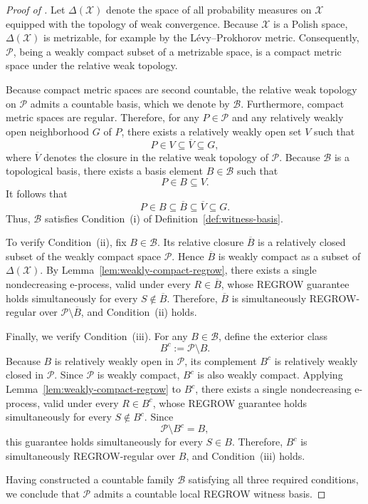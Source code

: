 \documentclass[12pt]{article}
\theoremstyle{spaced}
\theoremstyle{remark}
\begin{document}
\begin{proof}[Proof of ]
Let $\Delta(\mathcal{X})$ denote the space of all probability
measures on $\mathcal{X}$ equipped with the topology of weak
convergence. Because $\mathcal{X}$ is a Polish space,
$\Delta(\mathcal{X})$ is metrizable, for example by the
L\'evy--Prokhorov metric. Consequently, $\mathcal{P}$, being a
weakly compact subset of a metrizable space, is a compact metric
space under the relative weak topology.

Because compact metric spaces are second countable, the relative
weak topology on $\mathcal{P}$ admits a countable basis, which we
denote by $\mathcal{B}$. Furthermore, compact metric spaces are
regular. Therefore, for any $P\in\mathcal{P}$ and any relatively
weakly open neighborhood $G$ of $P$, there exists a relatively
weakly open set $V$ such that
\[
    P\in V\subseteq\overline V\subseteq G,
\]
where $\overline V$ denotes the closure in the relative weak
topology of $\mathcal{P}$. Because $\mathcal{B}$ is a
topological basis, there exists a basis element
$B\in\mathcal{B}$ such that
\[
    P\in B\subseteq V.
\]
It follows that
\[
    P\in B\subseteq\overline B
    \subseteq\overline V\subseteq G.
\]
Thus, $\mathcal{B}$ satisfies Condition~\textup{(i)} of
Definition~\ref{def:witness-basis}.

To verify Condition~\textup{(ii)}, fix $B\in\mathcal{B}$. Its
relative closure $\overline B$ is a relatively closed subset of
the weakly compact space $\mathcal{P}$. Hence $\overline B$ is
weakly compact as a subset of $\Delta(\mathcal X)$. By
Lemma~\ref{lem:weakly-compact-regrow}, there exists a single
nondecreasing e-process, valid under every
$R\in\overline B$, whose REGROW guarantee holds simultaneously
for every $S\notin\overline B$. Therefore, $\overline B$ is
simultaneously REGROW-regular over
$\mathcal{P}\setminus\overline B$, and
Condition~\textup{(ii)} holds.

Finally, we verify Condition~\textup{(iii)}. For any
$B\in\mathcal{B}$, define the exterior class
\[
    B^c:=\mathcal{P}\setminus B.
\]
Because $B$ is relatively weakly open in $\mathcal{P}$, its
complement $B^c$ is relatively weakly closed in $\mathcal{P}$.
Since $\mathcal{P}$ is weakly compact, $B^c$ is also weakly
compact. Applying Lemma~\ref{lem:weakly-compact-regrow} to
$B^c$, there exists a single nondecreasing e-process, valid
under every $R\in B^c$, whose REGROW guarantee holds
simultaneously for every $S\notin B^c$. Since
\[
    \mathcal{P}\setminus B^c=B,
\]
this guarantee holds simultaneously for every $S\in B$.
Therefore, $B^c$ is simultaneously REGROW-regular over $B$, and
Condition~\textup{(iii)} holds.

Having constructed a countable family $\mathcal{B}$ satisfying
all three required conditions, we conclude that $\mathcal{P}$
admits a countable local REGROW witness basis.
\end{proof}
\end{document}
